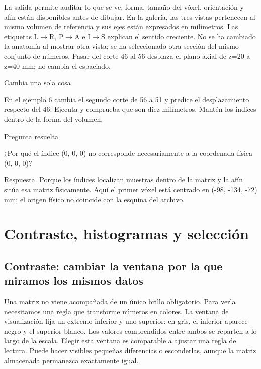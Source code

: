 
La salida permite auditar lo que se ve: forma, tamaño del vóxel, orientación y afín están disponibles antes de dibujar. En la galería, las tres vistas pertenecen al mismo volumen de referencia y sus ejes están expresados en milímetros. Las etiquetas L$\rightarrow$R, P$\rightarrow$A e I$\rightarrow$S explican el sentido creciente. No se ha cambiado la anatomía al mostrar otra vista; se ha seleccionado otra sección del mismo conjunto de números. Pasar del corte 46 al 56 desplaza el plano axial de z=20 a z=40 mm; no cambia el espaciado.



\begin{Practica}{Cambia una sola cosa}

En el ejemplo 6 cambia el segundo corte de 56 a 51 y predice el desplazamiento respecto del 46. Ejecuta y comprueba que son diez milímetros. Mantén los índices dentro de la forma del volumen.


\end{Practica}


\begin{Idea}{Pregunta resuelta}

¿Por qué el índice (0, 0, 0) no corresponde necesariamente a la coordenada física (0, 0, 0)?


Respuesta. Porque los índices localizan muestras dentro de la matriz y la afín sitúa esa matriz físicamente. Aquí el primer vóxel está centrado en (-98, -134, -72) mm; el origen físico no coincide con la esquina del archivo.


\end{Idea}

\chapter[Contar y seleccionar]{Contraste, histogramas y selección}

\label{cap:histogramas}

\section{Contraste: cambiar la ventana por la que miramos los mismos datos}


Una matriz no viene acompañada de un único brillo obligatorio. Para verla necesitamos una regla que transforme números en colores. La ventana de visualización fija un extremo inferior y uno superior: en gris, el inferior aparece negro y el superior blanco. Los valores comprendidos entre ambos se reparten a lo largo de la escala. Elegir esta ventana es comparable a ajustar una regla de lectura. Puede hacer visibles pequeñas diferencias o esconderlas, aunque la matriz almacenada permanezca exactamente igual.


